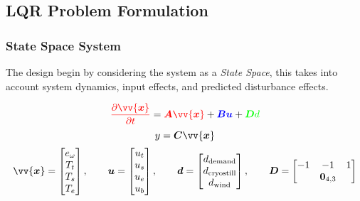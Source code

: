 \subsection{LQR Problem Formulation}

\subsubsection{State Space System}
\label{sec:lqr}

The design begin by considering the system as a \emph{State Space}, this takes into account {\color{red}system dynamics}, {\color{blue}input effects}, and predicted {\color{green}disturbance effects}.

    \begin{equation}
            {\color{red} \frac{ \partial \vv{\bm{x}} }{ \partial t } }  = {\color{red} \bm{A} \vv{\bm{x}}} + {\color{blue}\bm{B}{\bm{u}} }+ {\color{green}\bm{D} d}
    \end{equation}
        \begin{equation}
            y = \bm{C} \vv{\bm{x}}
        \end{equation}
        \begin{equation}
                \vv{\bm{x}} =
                \begin{bmatrix}
                        e_{\omega}\\
                        T_{t}\\
                        T_{s}\\
                        T_{e}\\
                \end{bmatrix}
                ,
                \qquad
                \bm{u} =
                \begin{bmatrix}
                        u_t\\
                        u_s\\
                        u_e\\
                        u_b\\
                \end{bmatrix}
                ,
                \qquad
                \bm{d} =
                \begin{bmatrix}
                        d_{\text{demand}}\\
                        d_{\text{cryostill}}\\
                        d_{\text{wind}}
                \end{bmatrix}
                ,
                \qquad
                \bm{D} =
                \begin{bmatrix}
                        -1 & -1 & 1 \\
                        \, & \bm{0}_{4,3} & \, \\
                \end{bmatrix}
        \end{equation}
